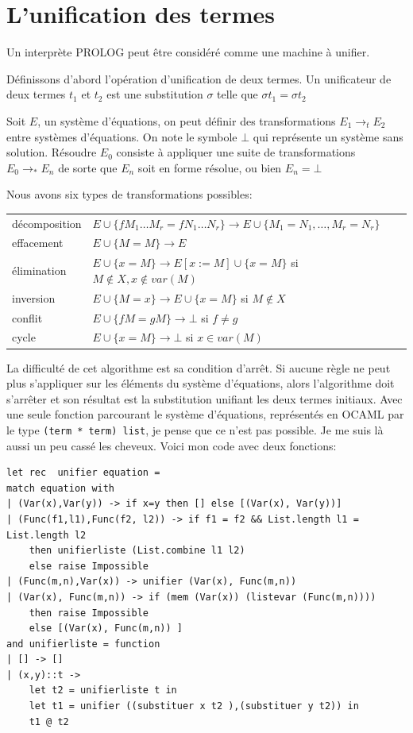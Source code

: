 \documentclass[11pt]{book}
\begin{document}
\section{L'unification des termes}
Un interprète PROLOG peut être considéré comme une machine à unifier.

Définissons d'abord l'opération d'unification de deux termes.
Un unificateur de deux termes $t_1$ et $t_2$ est une substitution $\sigma$ telle que $\sigma t_1 = \sigma t_2$

Soit $E$, un système d'équations, on peut définir des transformations $E_{1} \rightarrow _t   E_{2} $
entre systèmes d'équations. On note le symbole $\bot$ qui représente un système sans solution.
Résoudre $E_0$ consiste à appliquer une suite de transformations $E_{0} \rightarrow _*   E_{n} $ de sorte que
$E_{n}$ soit en forme résolue, ou bien $E_{n} = \bot$

Nous avons six types de transformations possibles: 


\begin{tabular}{ll}
décomposition & $E \cup \{ f M_1 \dots M_r = f N_1 \dots N_r \} \rightarrow   E \cup \{ M_1 = N_1 , \dots ,M_r = N_r \} $ \\ 
effacement & $E \cup \{ M=M \} \rightarrow   E $ \\ 
élimination & $E \cup \{ x=M \} \rightarrow  E[x:=M] \cup \{ x=M \}$  si $M \notin X, x \notin var(M)$\\ 
inversion & $E \cup \{ M=x \}  \rightarrow  E \cup \{ x=M \}$ si $M \notin X$ \\ 
conflit &  $E \cup \{ f M = g M\} \rightarrow   \bot $ si $ f \neq g $  \\ 
cycle & $E \cup \{ x=M \} \rightarrow  \bot $ si $x \in var(M)$ \\ 
\end{tabular}

\vspace{0.5cm}

La difficulté de cet algorithme est  sa condition d'arrêt. 
 Si aucune règle ne peut plus s'appliquer sur les éléments du système d'équations, alors l'algorithme doit s'arrêter et son résultat est
la substitution unifiant les deux termes initiaux.
Avec une seule fonction parcourant le système d'équations, représentés en OCAML par le type \verb+(term * term) list+,
je pense que ce n'est pas possible. Je me suis là aussi un peu cassé les cheveux.
Voici mon code avec deux fonctions:
\begin{Verbatim}
let rec  unifier equation =
match equation with
| (Var(x),Var(y)) -> if x=y then [] else [(Var(x), Var(y))] 
| (Func(f1,l1),Func(f2, l2)) -> if f1 = f2 && List.length l1 = List.length l2 
	then unifierliste (List.combine l1 l2)
	else raise Impossible
| (Func(m,n),Var(x)) -> unifier (Var(x), Func(m,n)) 
| (Var(x), Func(m,n)) -> if (mem (Var(x)) (listevar (Func(m,n)))) 
	then raise Impossible
	else [(Var(x), Func(m,n)) ] 
and unifierliste = function
| [] -> []
| (x,y)::t ->
	let t2 = unifierliste t in
	let t1 = unifier ((substituer x t2 ),(substituer y t2)) in
	t1 @ t2
\end{Verbatim}
% 
\end{document}
